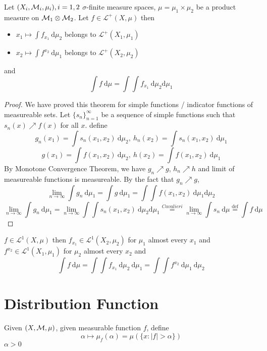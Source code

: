 \begin{theorem}
  Let $(X_i, \mathcal M_i, \mu_i), i=1,2$ $\sigma$-finite measure spaces, $\mu = \mu_1 \times \mu_2$ be a product measure on $\mathcal M_1 \otimes \mathcal M_2$. 
  Let $f \in \mathcal{L}^+(X, \mu)$ then 
  \begin{itemize}
    \item $x_1 \mapsto \int f_{x_1} \ \mathrm{d}\mu_2$ belongs to $\mathcal{L}^+(X_1, \mu_1)$
    \item $x_2 \mapsto \int f^{x_2} \ \mathrm{d}\mu_1$ belongs to $\mathcal{L}^+(X_2, \mu_2)$
  \end{itemize}
  and 
  \[\int f \ \mathrm{d}\mu = \int \int f_{x_1} \ \mathrm{d}\mu_2 \mathrm{d}\mu_1\]
\end{theorem}

\begin{proof}
  We have proved this theorem for simple functions / indicator functions of measureable sets.
  Let $\{s_n\}_{n=1}^\infty$ be a sequence of simple functions such that $s_n(x) \nearrow f(x)$ for all $x$. 
  define 
  \[g_n(x_1) = \int s_n(x_1, x_2) \ \mathrm{d}\mu_2,\ h_n(x_2) = \int s_n(x_1, x_2) \ \mathrm{d}\mu_1\]
  \[g(x_1) = \int f(x_1, x_2) \ \mathrm{d}\mu_2,\ h(x_2) = \int f(x_1, x_2) \ \mathrm{d}\mu_1\]
  By Monotone Convergence Theorem, we have $g_n \nearrow g$, $h_n \nearrow h$ and limit of measureable functions is measureable.
  By the fact that $g_n \nearrow g$, 
  \[\lim_{n\to\infty}\int g_n \ \mathrm{d}\mu_1 = \int g \ \mathrm{d}\mu_1 = \int \int f(x_1, x_2) \ \mathrm{d}\mu_1 \mathrm{d}\mu_2 \]
  \[\lim_{n\to\infty}\int g_n \ \mathrm{d}\mu_1 = \lim_{n\to\infty} \int\int s_n(x_1, x_2) \ \mathrm{d}\mu_2 \mathrm{d}\mu_1 \overset{Cavalieri}= \lim_{n\to\infty} \int s_n \ \mathrm{d}\mu \overset{\text{def}}= \int f \ \mathrm{d}\mu\]
\end{proof}

\begin{theorem}
  $f \in \mathcal{L}^1(X, \mu)$ then $f_{x_1} \in \mathcal{L}^1(X_2, \mu_2)$ for $\mu_1$ almost every $x_1$ and $f^{x_2} \in \mathcal{L}^1(X_1, \mu_1)$ for $\mu_2$ almost every $x_2$
  and 
  \[\int f \ \mathrm{d}\mu = \int \int f_{x_1} \ \mathrm{d}\mu_2 \ \mathrm{d}\mu_1 = \int \int f^{x_2} \ \mathrm{d}\mu_1 \ \mathrm{d}\mu_2\]
\end{theorem}

\section{Distribution Function}
\begin{definition}
  Given $(X, \mathcal M, \mu)$, given measurable function $f$, define
  \[\alpha \mapsto \mu_f(\alpha) = \mu(\{x : |f| > \alpha\})\]
  $\alpha > 0$
\end{definition}

